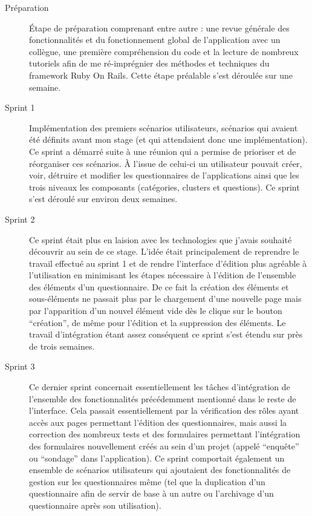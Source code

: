 \documentclass[12pt,a4paper]{book}
\begin{document}
\begin{description}
  \item[Préparation] Étape de préparation comprenant entre autre : une revue générale des fonctionnalités et du fonctionnement global de l'application avec un collègue, une première compréhension du code et la lecture de nombreux tutoriels afin de me ré-imprégnier des méthodes et techniques du framework Ruby On Rails. Cette étape préalable s'est déroulée sur une semaine.
  \item[Sprint 1] Implémentation des premiers scénarios utilisateurs, scénarios qui avaient été définits avant mon stage (et qui attendaient donc une implémentation). Ce sprint a démarré suite à une réunion qui a permise de prioriser et de réorganiser ces scénarios. À l'issue de celui-ci un utilisateur pouvait créer, voir, détruire et modifier les questionnaires de l'applications ainsi que les trois niveaux les composants (catégories, clusters et questions). Ce sprint s'est déroulé sur environ deux semaines.
  \item[Sprint 2] Ce sprint était plus en laision avec les technologies que j'avais souhaité découvrir au sein de ce stage. L'idée était principalement de reprendre le travail effectué au sprint 1 et de rendre l'interface d'édition plus agréable à l'utilisation en minimisant les étapes nécessaire à l'édition de l'ensemble des éléments d'un questionnaire. De ce fait la création des éléments et sous-éléments ne passait plus par le chargement d'une nouvelle page mais par l'apparition d'un nouvel élément vide dès le clique sur le bouton ``création'', de même pour l'édition et la suppression des éléments. Le travail d'intégration étant assez conséquent ce sprint s'est étendu sur près de trois semaines.
  \item[Sprint 3] Ce dernier sprint concernait essentiellement les tâches d'intégration de l'ensemble des fonctionnalités précédemment mentionné dans le reste de l'interface. Cela passait essentiellement par la vérification des rôles ayant accès aux pages permettant l'édition des questionnaires, mais aussi la correction des nombreux tests et des formulaires permettant l'intégration des formulaires nouvellement créés au sein d'un projet (appelé ``enquête'' ou ``sondage'' dans l'application). Ce sprint comportait également un ensemble de scénarios utilisateurs qui ajoutaient des fonctionnalités de gestion sur les questionnaires même (tel que la duplication d'un questionnaire afin de servir de base à un autre ou l'archivage d'un questionnaire après son utilisation).
\end{description}
\end{document}
